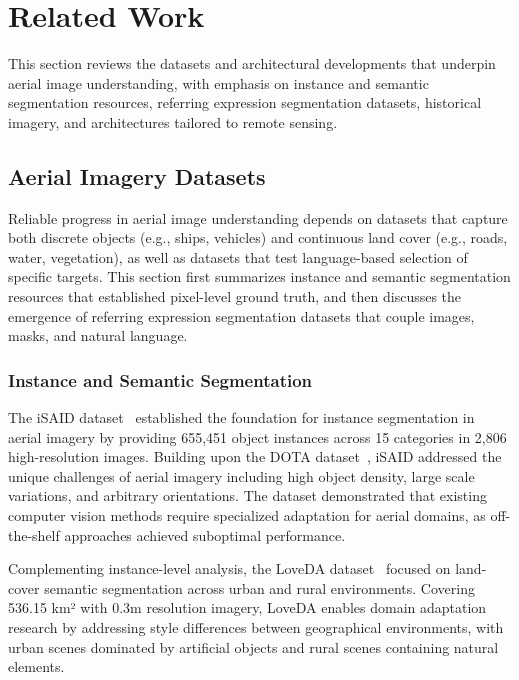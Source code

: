 
\section{Related Work}
\label{sec:related}

This section reviews the datasets and architectural developments that underpin aerial image understanding, with emphasis on instance and semantic segmentation resources, referring expression segmentation datasets, historical imagery, and architectures tailored to remote sensing.

\subsection{Aerial Imagery Datasets}

Reliable progress in aerial image understanding depends on datasets that capture both discrete objects (e.g., ships, vehicles) and continuous land cover (e.g., roads, water, vegetation), as well as datasets that test language-based selection of specific targets. This section first summarizes instance and semantic segmentation resources that established pixel-level ground truth, and then discusses the emergence of referring expression segmentation datasets that couple images, masks, and natural language.

\subsubsection{Instance and Semantic Segmentation}

The iSAID dataset~\cite{zamir2019isaid} established the foundation for instance segmentation in aerial imagery by providing 655,451 object instances across 15 categories in 2,806 high-resolution images. Building upon the DOTA dataset~\cite{xia2018dota}, iSAID addressed the unique challenges of aerial imagery including high object density, large scale variations, and arbitrary orientations. The dataset demonstrated that existing computer vision methods require specialized adaptation for aerial domains, as off-the-shelf approaches achieved suboptimal performance.

Complementing instance-level analysis, the LoveDA dataset~\cite{wang2021loveda} focused on land-cover semantic segmentation across urban and rural environments. Covering 536.15 km² with 0.3m resolution imagery, LoveDA enables domain adaptation research by addressing style differences between geographical environments, with urban scenes dominated by artificial objects and rural scenes containing natural elements.

